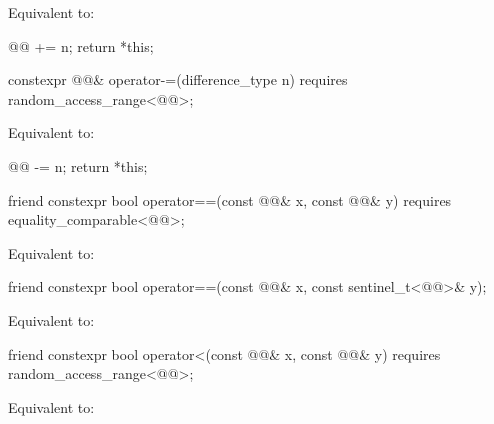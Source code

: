 \begin{itemdescr}
\pnum
\effects
Equivalent to:
\begin{codeblock}
@@ += n;
return *this;
\end{codeblock}
\end{itemdescr}

%
\begin{itemdecl}
constexpr @@& operator-=(difference_type n)
  requires random_access_range<@@>;
\end{itemdecl}

\begin{itemdescr}
\pnum
\effects
Equivalent to:
\begin{codeblock}
@@ -= n;
return *this;
\end{codeblock}
\end{itemdescr}

%
\begin{itemdecl}
friend constexpr bool operator==(const @@& x, const @@& y)
  requires equality_comparable<@@>;
\end{itemdecl}

\begin{itemdescr}
\pnum
\effects
Equivalent to: 
\end{itemdescr}

%
\begin{itemdecl}
friend constexpr bool operator==(const @@& x, const sentinel_t<@@>& y);
\end{itemdecl}

\begin{itemdescr}
\pnum
\effects
Equivalent to: 
\end{itemdescr}

%
\begin{itemdecl}
friend constexpr bool operator<(const @@& x, const @@& y)
  requires random_access_range<@@>;
\end{itemdecl}

\begin{itemdescr}
\pnum
\effects
Equivalent to: 
\end{itemdescr}

